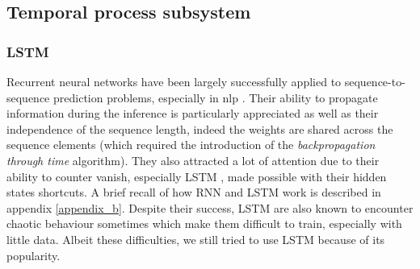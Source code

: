 \documentclass[12pt, a4paper]{report}
\begin{document}
			\subsection{Temporal process subsystem}\label{lstm}
				\subsubsection{LSTM}\label{lstm}
					Recurrent neural networks have been largely successfully applied to sequence-to-sequence prediction problems, especially in \gls{nlp} \cite{wu2016google,shen2018natural,miao2020application}.
					Their ability to propagate information during the inference is particularly appreciated as well as their independence of the sequence length, indeed the weights are shared across the sequence elements (which required the introduction of the {\itshape backpropagation through time} algorithm).
					They also attracted a lot of attention due to their ability to counter \gls{vanish}, especially LSTM \cite{Hochreiter1997lstm}, made possible with their hidden states shortcuts.
					A brief recall of how RNN and LSTM work is described in appendix \ref{appendix_b}.
					Despite their success, LSTM are also known to encounter chaotic behaviour sometimes \cite{bertschinger2004,laurent2016recurrent} which make them difficult to train, especially with little data.
					Albeit these difficulties, we still tried to use LSTM because of its popularity.
\end{document}
